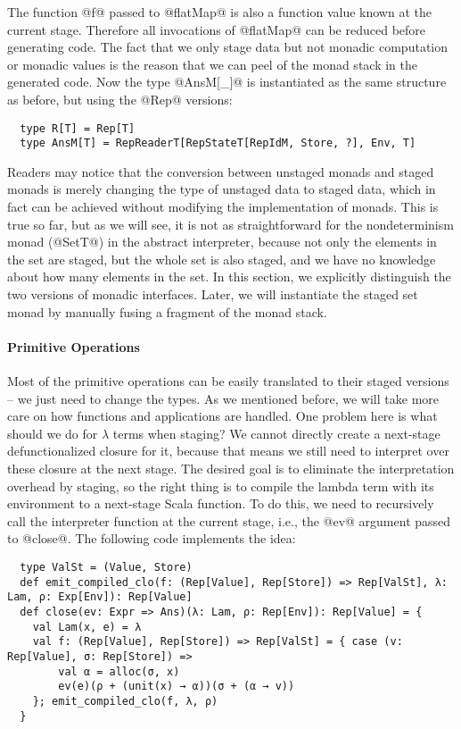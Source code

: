 The function @f@ passed to @flatMap@ is also a function value known at the current stage.
Therefore all invocations of @flatMap@ can be reduced before generating code.
The fact that we only stage data but not monadic computation or monadic
values is the reason that we can peel of the monad stack in the generated code.
Now the type @AnsM[_]@ is instantiated as the same structure as before, but using the
@Rep@ versions:
\begin{lstlisting}
  type R[T] = Rep[T]
  type AnsM[T] = RepReaderT[RepStateT[RepIdM, Store, ?], Env, T]
\end{lstlisting}

Readers may notice that the conversion between unstaged monads and staged monads
is merely changing the type of unstaged data to staged data, which in fact can
be achieved without modifying the implementation of monads. This is true so far,
but as we will see, it is not as straightforward for the nondeterminism monad
(@SetT@) in the abstract interpreter, because not only the elements in the set are
staged, but the whole set is also staged, and we have no knowledge about how
many elements in the set. In this section, we explicitly distinguish the two
versions of monadic interfaces. Later, we will instantiate the staged set monad
by manually fusing a fragment of the monad stack.

\paragraph{Primitive Operations} Most of the primitive operations can be easily
translated to their staged versions -- we just need to change the types.
As we mentioned before, we will take more care on how functions and
applications are handled.  One problem here is what should we do for
$\lambda$ terms when staging? We cannot directly create a next-stage
defunctionalized closure for it, because that means we still need to
interpret over these closure at the next stage.  The desired goal is to
eliminate the interpretation overhead by staging, so the right thing is to
compile the lambda term with its environment to a next-stage Scala function. To
do this, we need to recursively call the interpreter function at the current stage,
i.e., the @ev@ argument passed to @close@.  The following code implements the
idea:
\begin{lstlisting}
  type ValSt = (Value, Store)
  def emit_compiled_clo(f: (Rep[Value], Rep[Store]) => Rep[ValSt], λ: Lam, ρ: Exp[Env]): Rep[Value]
  def close(ev: Expr => Ans)(λ: Lam, ρ: Rep[Env]): Rep[Value] = {
    val Lam(x, e) = λ
    val f: (Rep[Value], Rep[Store]) => Rep[ValSt] = { case (v: Rep[Value], σ: Rep[Store]) =>
        val α = alloc(σ, x)
        ev(e)(ρ + (unit(x) → α))(σ + (α → v))
    }; emit_compiled_clo(f, λ, ρ)
  }
\end{lstlisting}

